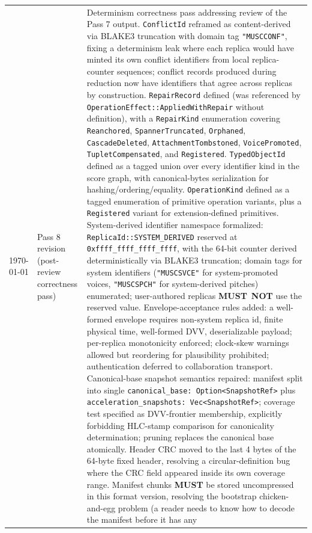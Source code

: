 \documentclass[11pt,letterpaper]{report}
\newcommand{\MUST}{\textbf{MUST}}
\newcommand{\MUSTNOT}{\textbf{MUST}\nobreak\ \textbf{NOT}}
\begin{document}
\begin{longtable}{p{2cm} p{2.5cm} p{9cm}}
  \today & Pass 8 revision (post-review correctness pass) &
  Determinism correctness pass addressing review of the
  Pass 7 output. \texttt{ConflictId} reframed as content-derived
  via BLAKE3 truncation with domain tag \texttt{"MUSCCONF"},
  fixing a determinism leak where each replica would have minted
  its own conflict identifiers from local replica-counter
  sequences; conflict records produced during reduction now have
  identifiers that agree across replicas by construction.
  \texttt{RepairRecord} defined (was referenced by
  \texttt{OperationEffect::AppliedWithRepair} without
  definition), with a \texttt{RepairKind} enumeration covering
  \texttt{Reanchored}, \texttt{SpannerTruncated},
  \texttt{Orphaned}, \texttt{CascadeDeleted},
  \texttt{AttachmentTombstoned}, \texttt{VoicePromoted},
  \texttt{TupletCompensated}, and \texttt{Registered}.
  \texttt{TypedObjectId} defined as a tagged union over every
  identifier kind in the score graph, with canonical-bytes
  serialization for hashing/ordering/equality.
  \texttt{OperationKind} defined as a tagged enumeration of
  primitive operation variants, plus a \texttt{Registered}
  variant for extension-defined primitives. System-derived
  identifier namespace formalized:
  \texttt{ReplicaId::SYSTEM\_DERIVED} reserved at
  \texttt{0xffff\_ffff\_ffff\_ffff}, with the 64-bit counter
  derived deterministically via BLAKE3 truncation; domain tags
  for system identifiers (\texttt{"MUSCSVCE"} for
  system-promoted voices, \texttt{"MUSCSPCH"} for system-derived
  pitches) enumerated; user-authored replicas \MUSTNOT{} use
  the reserved value. Envelope-acceptance rules added: a
  well-formed envelope requires non-system replica id, finite
  physical time, well-formed DVV, deserializable payload;
  per-replica monotonicity enforced; clock-skew warnings allowed
  but reordering for plausibility prohibited; authentication
  deferred to collaboration transport. Canonical-base snapshot
  semantics repaired: manifest split into single
  \texttt{canonical\_base: Option<SnapshotRef>} plus
  \texttt{acceleration\_snapshots: Vec<SnapshotRef>}; coverage
  test specified as DVV-frontier membership, explicitly
  forbidding HLC-stamp comparison for canonicality determination;
  pruning replaces the canonical base atomically. Header CRC
  moved to the last 4 bytes of the 64-byte fixed header,
  resolving a circular-definition bug where the CRC field
  appeared inside its own coverage range. Manifest chunks
  \MUST{} be stored uncompressed in this format version,
  resolving the bootstrap chicken-and-egg problem (a reader
  needs to know how to decode the manifest before it has any

\end{longtable}
\end{document}
